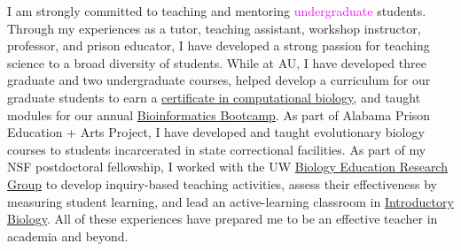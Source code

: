 \documentclass[letterpaper, 10pt]{letter}
\newcommand{\highlight}[1]{\textcolor{magenta}{#1}}
\begin{document}
\begin{letter}

I am strongly committed to teaching and mentoring
\highlight{
    undergraduate
}
students.
Through my experiences as a tutor, teaching assistant, workshop instructor,
professor, and prison educator, 
I have developed a strong passion for teaching science to a broad diversity of
students.
While at AU, I have developed three graduate and two
undergraduate courses,
helped develop a
curriculum for our graduate students to earn a
\href{http://bulletin.auburn.edu/thegraduateschool/graduatedegreesoffered/biologicalsciencesmsphd_major/computationalbiology_gradcert/}{
    certificate in computational biology},
and taught modules for our annual 
\href{http://www.auburn.edu/cosam/bioinformatics/}{Bioinformatics Bootcamp}.
As part of Alabama Prison Education + Arts Project,
I have developed and taught evolutionary biology courses to students incarcerated in state correctional facilities.
As part of my NSF postdoctoral fellowship, I
worked with the UW
\href{https://sites.google.com/site/uwbioedresgroup/home}{Biology Education
    Research Group} to develop
inquiry-based teaching activities, assess their effectiveness
by measuring student learning, and lead an active-learning classroom in
\href{http://courses.biology.washington.edu/biol180/}{Introductory Biology}.
All of these experiences have prepared me to be an effective teacher in
academia and beyond.


\end{letter}
\end{document}
